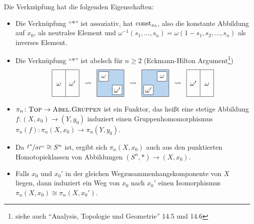 \begin{bemerkung}[{name=[{Eigenschaften von $\pi_n(X,x_0)$}]}]
	Die Verknüpfung hat die folgenden Eigenschaften:
	\begin{itemize}
		\item Die Verknüpfung \enquote{$*$} ist assoziativ, hat $\operatorname{const}_{x_0}$, also die konstante Abbildung auf $x_0$, als neutrales Element und 
		$\omega ^{-1}(s_1,\ldots ,s_n)= \omega(1-s_1,s_2, \ldots ,s_n)$ als inverses Element.
		\item Die Verknüpfung \enquote{$*$} ist abelsch für $n \ge 2$ (Eckmann-Hilton Argument\footnote{siehe auch \enquote{Analysis, Topologie und Geometrie} 14.5 und 14.6})
		\[
			\vcenter{\hbox{\begin{tikzpicture}[scale=1.4]
				\draw (0,0) rectangle (1,1);
				\draw (0.5,0) -- (0.5,1);
				\node at (0.25,0.5) {$\omega\vphantom{\omega^\prime}$};
				\node at (0.75,0.5) {$\omega^\prime$};
			\end{tikzpicture}}}
			\enspace\leadsto\enspace	
			\vcenter{\hbox{\begin{tikzpicture}[scale=1.4, every node/.style={draw,minimum size=5mm,inner sep=2pt,fill=white}]
				\draw[fill=DodgerBlue3!30] (0,0) rectangle (1,1);
				\node at (0.25,0.75) {$\omega$};
				\node at (0.75,0.25) {$\omega^\prime$};
			\end{tikzpicture}}}
			\enspace\leadsto\enspace
			\vcenter{\hbox{\begin{tikzpicture}[scale=1.4, every node/.style={draw,minimum size=5mm,inner sep=2pt,fill=white}]
				\draw[fill=DodgerBlue3!30] (0,0) rectangle (1,1);
				\node at (0.75,0.75) {$\omega$};
				\node at (0.25,0.25) {$\omega^\prime$};
			\end{tikzpicture}}}
			\enspace\leadsto\enspace
			\vcenter{\hbox{\begin{tikzpicture}[scale=1.4]
				\draw (0,0) rectangle (1,1);
				\draw (0.5,0) -- (0.5,1);
				\node at (0.25,0.5) {$\omega^\prime$};
				\node at (0.75,0.5) {$\omega\vphantom{\omega^\prime}$};
			\end{tikzpicture}}}	
		\]
		\item $\pi_n\colon \textsc{Top}  \to \textsc{Abel.Gruppen}$ ist ein Funktor, das heißt eine stetige Abbildung $f \colon (X,x_0) \to (Y,y_0)$ induziert einen Gruppenhomomorphismus 
		$\pi_n(f) \colon \pi_n(X,x_0) \to \pi_n(Y,y_0)$.
		\item Da $\nicefrac{I^n}{\partial I^n} \cong S^n$ ist, ergibt sich $\pi_n(X,x_0)$ auch aus den punktierten Homotopieklassen von Abbildungen $(S^n,*) \to (X,x_0)$.
		\item Falls $x_0$ und $x_0'$ in der gleichen Wegzusammenhangskomponente von $X$ liegen, dann induziert ein Weg von $x_0$ nach $x_0'$ einen Isomorphismus $\pi_n(X,x_0) \cong \pi_n(X,x_0')$.
	\end{itemize}
\end{bemerkung}

